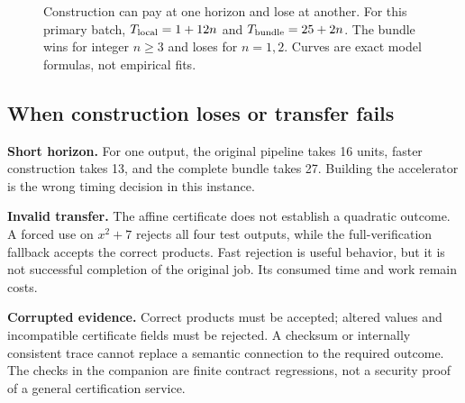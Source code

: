 \documentclass[11pt,letterpaper]{article}
\theoremstyle{remark}\newtheorem{remark}{Remark}[section]
\begin{document}
\begin{figure}[t]
\centering
{}
\caption{Construction can pay at one horizon and lose at another.
For this primary batch, $T_{\rm local}=1+12n$ and $T_{\rm bundle}=25+2n$.
The bundle wins for integer $n\ge3$ and loses for $n=1,2$.
Curves are exact model formulas, not empirical fits.}
\label{fig:horizon}
\end{figure}

\subsection{When construction loses or transfer fails}
\textbf{Short horizon.}
For one output, the original pipeline takes 16 units, faster construction takes 13, and the complete bundle takes 27.
Building the accelerator is the wrong timing decision in this instance.

\textbf{Invalid transfer.}
The affine certificate does not establish a quadratic outcome.
A forced use on $x^2+7$ rejects all four test outputs, while the full-verification fallback accepts the correct products.
Fast rejection is useful behavior, but it is not successful completion of the original job.
Its consumed time and work remain costs.

\textbf{Corrupted evidence.}
Correct products must be accepted; altered values and incompatible certificate fields must be rejected.
A checksum or internally consistent trace cannot replace a semantic connection to the required outcome.
The checks in the companion are finite contract regressions, not a security proof of a general certification service.
\end{document}
